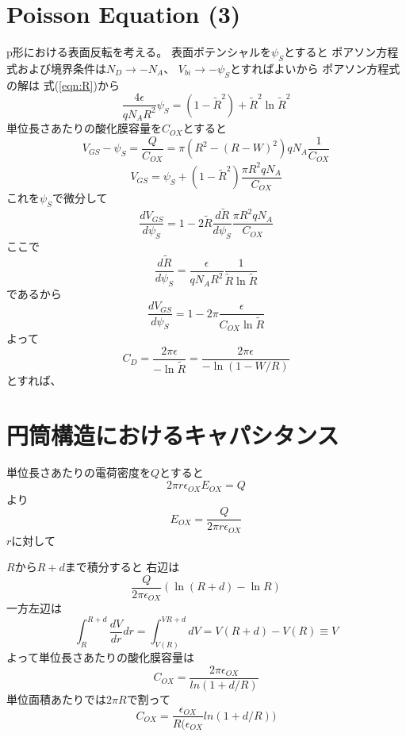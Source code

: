 \documentclass[11pt,uplatex]{jsarticle}
\def\d#1#2{\frac{d #1}{d #2}}
\begin{document}
\section{Poisson Equation (3)}
p形における表面反転を考える。
表面ポテンシャルを$\psi_S$とすると
ポアソン方程式および境界条件は$N_D \to -N_A$、
$V_{bi} \to -\psi_S$とすればよいから
ポアソン方程式の解は
式(\ref{eqn:R})から
\begin{equation}
 \frac{4 \epsilon}{q N_A R^2} \psi_{S} = (1-\tilde{R}^2)+\tilde{R}^2 \ln \tilde{R}^2\label{eqn:R}
\end{equation}
単位長さあたりの酸化膜容量を$C_{OX}$とすると
\begin{equation}
 V_{GS} - \psi_S = \frac{Q}{C_{OX}} = \pi(R^2-(R-W)^2) q N_A \frac{1}{C_{OX}}
\end{equation}
\begin{equation}
V_{GS} = \psi_S + (1-\tilde{R}^2) \frac{\pi R^2 q N_A }{C_{OX}}
\end{equation}
これを$\psi_S$で微分して
\begin{equation}
 \d{V_{GS}}{\psi_S} = 1 - 2 \tilde{R} \d{\tilde{R}}{\psi_S}  \frac{\pi R^2 q N_A }{C_{OX}}
\end{equation}
ここで
\begin{equation}
 \d{\tilde{R}}{\psi_{S}} = \frac{\epsilon}{q N_A R^2} \frac{1}{\tilde{R}
  \ln \tilde{R}}
\end{equation}
であるから
\begin{equation}
 \d{V_{GS}}{\psi_S} = 1 - 2 \pi \frac{\epsilon}{ C_{OX} \ln \tilde{R}}
\end{equation}
よって
\begin{equation}
 C_D = \frac{2 \pi \epsilon}{-\ln\tilde{R}} = \frac{2 \pi \epsilon}{-\ln(1-W/R)}
\end{equation}
とすれば、


\appendix
\section{円筒構造におけるキャパシタンス}
単位長さあたりの電荷密度を$Q$とすると
\begin{equation}
 2 \pi r \epsilon_{OX} E_{OX} = Q 
\end{equation}
より
\begin{equation}
  E_{OX} = \frac{Q }{2 \pi r \epsilon_{OX} }
\end{equation}
$r$に対して


$R$から$R+d$まで積分すると
右辺は
\begin{equation}
 \frac{Q}{2 \pi \epsilon_{OX}} (\ln (R+d)-\ln R)
\end{equation}
一方左辺は
\begin{equation}
 \int_R^{R+d} \d{V}{r} dr =
   \int_{V(R)}^{V{R+d}} dV
  =  V(R+d)-V(R) \equiv V
\end{equation}
よって単位長さあたりの酸化膜容量は
\begin{equation}
 C_{OX} =\frac{ 2 \pi \epsilon_{OX}}{ln(1+d/R)}
\end{equation}
単位面積あたりでは$2 \pi R$で割って
\begin{equation}
 C_{OX} = \frac{\epsilon_{OX} }{R(\epsilon_{OX}}{ln(1+d/R))}
\end{equation}
\end{document}
